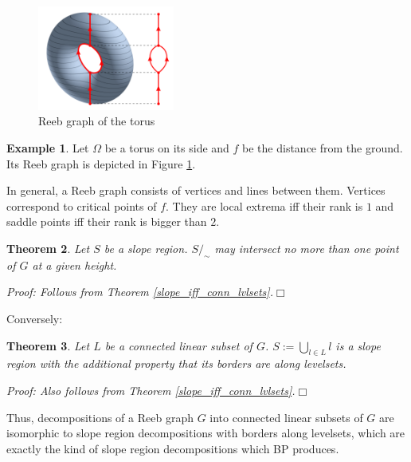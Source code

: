 \documentclass[a4paper,12pt,notitlepage,fullpage]{paper}
\theoremstyle{plain}
\newtheorem{thm}{Theorem}[section] %
\theoremstyle{definition}
\newtheorem{exmp}[thm]{Example} %
\begin{document}
\begin{figure}
\centering
\includegraphics[width=0.4\textwidth]{img/Reebgraph.png}
\caption{Reeb graph of the torus}
\label{fig:reeb_torus}
\end{figure}

\begin{exmp}
Let $\Omega$ be a torus on its side and $f$ be the distance from the ground.
Its Reeb graph is depicted in Figure \ref{fig:reeb_torus}.
\end{exmp}

In general, a Reeb graph consists of vertices and lines between them.
Vertices correspond to critical points of $f$.
They are local extrema iff their rank is $1$ and saddle points iff their rank is bigger than $2$.

\begin{thm}
Let $S$ be a slope region.
$S/_\sim$ may intersect no more than one point of $G$ at a given height.

\emph{Proof:} Follows from Theorem \ref{slope_iff_conn_lvlsets}.\hfill $\Box$
\end{thm}

Conversely:

\begin{thm}
Let $L$ be a connected linear subset of $G$.
$S := \bigcup_{l \in L} l$ is a slope region with the additional property that its borders are along levelsets.

\emph{Proof:} Also follows from Theorem \ref{slope_iff_conn_lvlsets}.\hfill $\Box$
\end{thm}

Thus, decompositions of a Reeb graph $G$ into connected linear subsets of $G$ are isomorphic to slope region decompositions with borders along levelsets, which are exactly the kind of slope region decompositions which BP produces.
\end{document}
